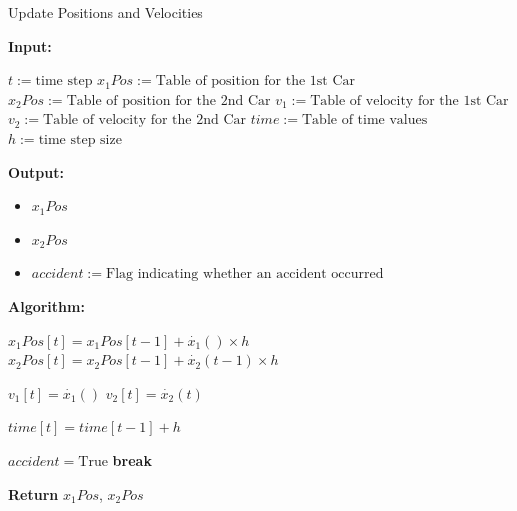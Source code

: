 \documentclass{article}
\begin{document}
			
			\begin{algorithm}[H]
				\caption{Update Positions and Velocities}\label{alg:update_positions}
				\begin{algorithmic}
					\State \textbf{Input:} \\
					\begin{itemize}
						\State $t:=\text{time step}$
						\State $x_1Pos:=\text{Table of position for the 1st Car}$
						\State $x_2Pos:=\text{Table of position for the 2nd Car}$
						\State $v_1:=\text{Table of velocity for the 1st Car}$
						\State $v_2:=\text{Table of velocity for the 2nd Car}$
						\State $time:=\text{Table of time values}$
						\State $h:=\text{time step size}$
					\end{itemize}
					\State \textbf{Output:} \\
					\begin{itemize}
						\item $x_1Pos$ 
						\item $x_2Pos$
					\end{itemize}
					\begin{itemize}[]
						\item $accident:=\text{Flag indicating whether an accident occurred}$
					\end{itemize}
					\State \textbf{Algorithm:} \\
					\begin{itemize}[]
						\State $x_1Pos[t] = x_1Pos[t-1] + \dot{x_1}() \times h$
						\State $x_2Pos[t] = x_2Pos[t-1] + \dot{x_2}(t-1) \times h$
						
						\State $v_1[t] = \dot{x_1}()$
						\State $v_2[t] = \dot{x_2}(t)$
						
						\State $time[t] = time[t-1] + h$
						
						\State $accident = \text{True}$
						\State \textbf{break}
						\EndIf
						\EndFor
					\end{itemize}
					\State \textbf{Return} $x_1Pos$, $x_2Pos$
				\end{algorithmic}
			\end{algorithm}
			
			
			
\end{document}
